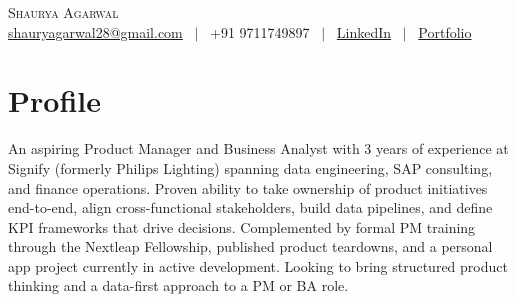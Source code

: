 \documentclass[10pt]{article}
\begin{document}
\begin{center}
  {\Huge \scshape Shaurya Agarwal} \\[6pt]
  \small
  \href{mailto:shauryagarwal28@gmail.com}{shauryagarwal28@gmail.com} \ $|$ \ +91 9711749897 \ $|$ \
  \href{https://www.linkedin.com/in/shauryaagarwal28/}{LinkedIn} \ $|$ \
  \href{https://shauryagarwal28.github.io/}{Portfolio}
\end{center}

\section*{Profile}
An aspiring Product Manager and Business Analyst with 3 years of experience at Signify (formerly
Philips Lighting) spanning data engineering, SAP consulting, and finance operations. Proven ability to take ownership
of product initiatives end-to-end, align cross-functional stakeholders, build data pipelines, and define KPI
frameworks that drive decisions. Complemented by formal PM training through the Nextleap Fellowship, published
product teardowns, and a personal app project currently in active development. Looking to bring structured product
thinking and a data-first approach to a PM or BA role.
\end{document}

